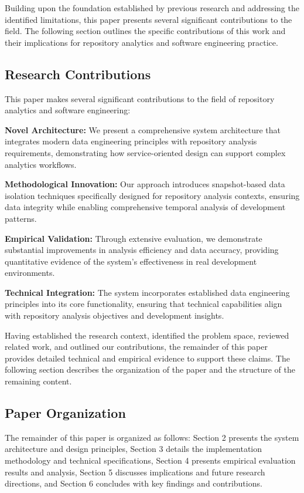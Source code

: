\documentclass[12pt,a4paper]{article}
\begin{document}
Building upon the foundation established by previous research and addressing the identified limitations, this paper presents several significant contributions to the field. The following section outlines the specific contributions of this work and their implications for repository analytics and software engineering practice.

\subsection{Research Contributions}

This paper makes several significant contributions to the field of repository analytics and software engineering:

\textbf{Novel Architecture:} We present a comprehensive system architecture that integrates modern data engineering principles with repository analysis requirements, demonstrating how service-oriented design can support complex analytics workflows.

\textbf{Methodological Innovation:} Our approach introduces snapshot-based data isolation techniques specifically designed for repository analysis contexts, ensuring data integrity while enabling comprehensive temporal analysis of development patterns.

\textbf{Empirical Validation:} Through extensive evaluation, we demonstrate substantial improvements in analysis efficiency and data accuracy, providing quantitative evidence of the system's effectiveness in real development environments.

\textbf{Technical Integration:} The system incorporates established data engineering principles into its core functionality, ensuring that technical capabilities align with repository analysis objectives and development insights.

Having established the research context, identified the problem space, reviewed related work, and outlined our contributions, the remainder of this paper provides detailed technical and empirical evidence to support these claims. The following section describes the organization of the paper and the structure of the remaining content.

\subsection{Paper Organization}

The remainder of this paper is organized as follows: Section 2 presents the system architecture and design principles, Section 3 details the implementation methodology and technical specifications, Section 4 presents empirical evaluation results and analysis, Section 5 discusses implications and future research directions, and Section 6 concludes with key findings and contributions.
\end{document}
